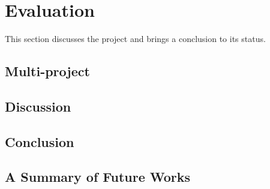 \chapter{Evaluation}\label{chap:evaluation}
This section discusses the project and brings a conclusion to its status.

\section{Multi-project}\label{sec:eval:multiproject}


\section{Discussion}\label{sec:eval:discussion}


\section{Conclusion}


\section{A Summary of Future Works}
